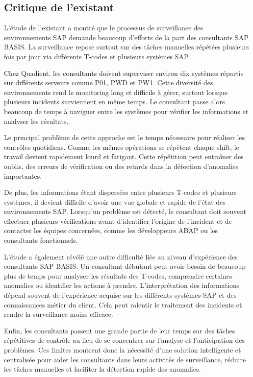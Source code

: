 \setcounter{secnumdepth}{2}

\subsection{Critique de l'existant}
L’étude de l’existant a montré que le processus de surveillance des environnements SAP demande beaucoup d’efforts de la part des consultants SAP BASIS. La surveillance repose surtout sur des tâches manuelles répétées plusieurs fois par jour via différents T-codes et plusieurs systèmes SAP.

Chez Quadient, les consultants doivent superviser environ dix systèmes répartis sur différents serveurs comme P01, PWD et PW1. Cette diversité des environnements rend le monitoring long et difficile à gérer, surtout lorsque plusieurs incidents surviennent en même temps. Le consultant passe alors beaucoup de temps à naviguer entre les systèmes pour vérifier les informations et analyser les résultats.

Le principal problème de cette approche est le temps nécessaire pour réaliser les contrôles quotidiens. Comme les mêmes opérations se répètent chaque shift, le travail devient rapidement lourd et fatigant. Cette répétition peut entraîner des oublis, des erreurs de vérification ou des retards dans la détection d’anomalies importantes.

De plus, les informations étant dispersées entre plusieurs T-codes et plusieurs systèmes, il devient difficile d’avoir une vue globale et rapide de l’état des environnements SAP. Lorsqu’un problème est détecté, le consultant doit souvent effectuer plusieurs vérifications avant d’identifier l’origine de l’incident et de contacter les équipes concernées, comme les développeurs ABAP ou les consultants fonctionnels.

L’étude a également révélé une autre difficulté liée au niveau d’expérience des consultants SAP BASIS. Un consultant débutant peut avoir besoin de beaucoup plus de temps pour analyser les résultats des T-codes, comprendre certaines anomalies ou identifier les actions à prendre. L'interprétation des informations dépend souvent de l’expérience acquise sur les différents systèmes SAP et des connaissances métier du client. Cela peut ralentir le traitement des incidents et rendre la surveillance moins efficace.

Enfin, les consultants passent une grande partie de leur temps sur des tâches répétitives de contrôle au lieu de se concentrer sur l’analyse et l’anticipation des problèmes. Ces limites montrent donc la nécessité d’une solution intelligente et centralisée pour aider les consultants dans leurs activités de surveillance, réduire les tâches manuelles et faciliter la détection rapide des anomalies.


